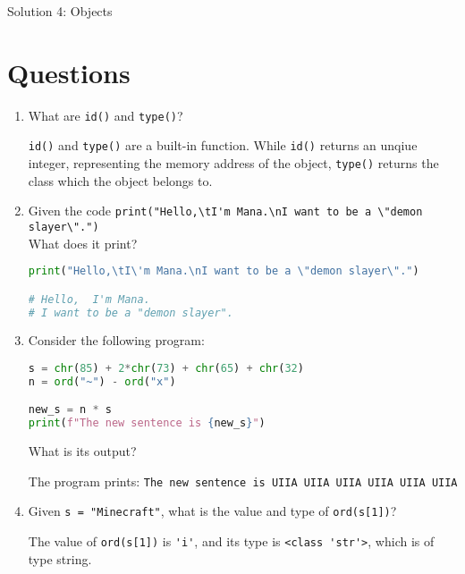 \documentclass[11pt]{article}
\begin{document}
\begin{center}
    \Large{Solution 4: Objects}
\end{center}

\section*{Questions}

\begin{enumerate}
    \item {
        What are \texttt{id()} and \texttt{type()}?
        \begin{tcolorbox}[colback=black!10!white, colframe=black!75!white, title=\textbf{Answer}]
            \texttt{id()} and \texttt{type()} are a built-in function. While \texttt{id()} returns an unqiue integer, representing the memory address of the object, \texttt{type()} returns the class which the object belongs to.
        \end{tcolorbox}
    }
    \item {
        Given the code \verb|print("Hello,\tI'm Mana.\nI want to be a \"demon slayer\".")|\\
        What does it print?

\begin{lstlisting}[language=Python]
print("Hello,\tI\'m Mana.\nI want to be a \"demon slayer\".")

# Hello,  I'm Mana.
# I want to be a "demon slayer".
\end{lstlisting}
                
    }
    \item {
        Consider the following program:

\begin{lstlisting}[language=Python]
s = chr(85) + 2*chr(73) + chr(65) + chr(32)
n = ord("~") - ord("x")

new_s = n * s
print(f"The new sentence is {new_s}")
\end{lstlisting}
    \noindent
    What is its output?
    \begin{tcolorbox}[colback=black!10!white, colframe=black!75!white, title=\textbf{Answer}]
        The program prints: \verb|The new sentence is UIIA UIIA UIIA UIIA UIIA UIIA|
    \end{tcolorbox}
    }
    \item {
        Given \verb|s = "Minecraft"|, what is the value and type of \verb|ord(s[1])|?
        \begin{tcolorbox}[colback=black!10!white, colframe=black!75!white, title=\textbf{Answer}]
            The value of \verb|ord(s[1])| is \verb|'i'|, and its type is \verb|<class 'str'>|, which is of type string.
        \end{tcolorbox}    
    }
\end{enumerate}
\end{document}
